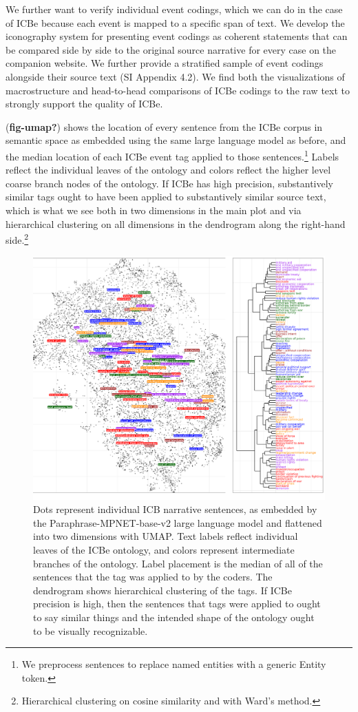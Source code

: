 \documentclass{article}
\begin{document}
We further want to verify individual event codings, which we can do in
the case of ICBe because each event is mapped to a specific span of
text. We develop the iconography system for presenting event codings as
coherent statements that can be compared side by side to the original
source narrative for every case on the companion website. We further
provide a stratified sample of event codings alongside their source text
(SI Appendix 4.2). We find both the visualizations of macrostructure and
head-to-head comparisons of ICBe codings to the raw text to strongly
support the quality of ICBe.

(\textbf{fig-umap?}) shows the location of every sentence from the ICBe
corpus in semantic space as embedded using the same large language model
as before, and the median location of each ICBe event tag applied to
those sentences.\footnote{We preprocess sentences to replace named
  entities with a generic Entity token.} Labels reflect the individual
leaves of the ontology and colors reflect the higher level coarse branch
nodes of the ontology. If ICBe has high precision, substantively similar
tags ought to have been applied to substantively similar source text,
which is what we see both in two dimensions in the main plot and via
hierarchical clustering on all dimensions in the dendrogram along the
right-hand side.\footnote{Hierarchical clustering on cosine similarity
  and with Ward's method.}

\begin{figure}
\hypertarget{fig-umap}{%
\centering
\includegraphics{p_semantic_embeddings_dendro.png}
\caption{Dots represent individual ICB narrative sentences, as embedded
by the Paraphrase-MPNET-base-v2 large language model and flattened into
two dimensions with UMAP. Text labels reflect individual leaves of the
ICBe ontology, and colors represent intermediate branches of the
ontology. Label placement is the median of all of the sentences that the
tag was applied to by the coders. The dendrogram shows hierarchical
clustering of the tags. If ICBe precision is high, then the sentences
that tags were applied to ought to say similar things and the intended
shape of the ontology ought to be visually
recognizable.}\label{fig-umap}
}
\end{figure}
\end{document}
